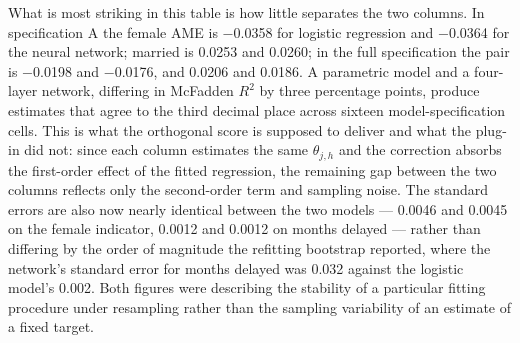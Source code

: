 \documentclass[12pt]{article}
\begin{document}
	What is most striking in this table is how little separates the two columns. In specification A the female AME is $-$0.0358 for logistic regression and $-$0.0364 for the neural network; married is 0.0253 and 0.0260; in the full specification the pair is $-$0.0198 and $-$0.0176, and 0.0206 and 0.0186. A parametric model and a four-layer network, differing in McFadden $R^2$ by three percentage points, produce estimates that agree to the third decimal place across sixteen model-specification cells. This is what the orthogonal score is supposed to deliver and what the plug-in did not: since each column estimates the same $\theta_{j,h}$ and the correction absorbs the first-order effect of the fitted regression, the remaining gap between the two columns reflects only the second-order term and sampling noise. The standard errors are also now nearly identical between the two models --- 0.0046 and 0.0045 on the female indicator, 0.0012 and 0.0012 on months delayed --- rather than differing by the order of magnitude the refitting bootstrap reported, where the network's standard error for months delayed was 0.032 against the logistic model's 0.002. Both figures were describing the stability of a particular fitting procedure under resampling rather than the sampling variability of an estimate of a fixed target.
	
\end{document}
